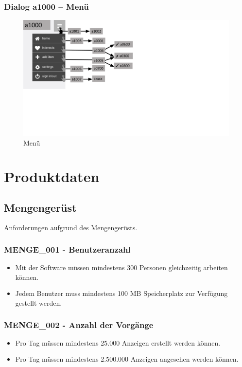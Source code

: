 \documentclass[a4paper,12pt,oneside]{scrartcl}
\begin{document}
\subsubsection{Dialog a1000 – Menü}
\begin{figure}[!htbp]
\centering
\noindent\includegraphics[width=\linewidth,height=\textheight,keepaspectratio]{Dialoge/a1000}
\caption{Menü}
\end{figure}
\FloatBarrier


\section{Produktdaten}
\subsection{Mengengerüst}
Anforderungen aufgrund des Mengengerüsts. 

\subsubsection*{MENGE\_001 - Benutzeranzahl}
\begin{itemize}
	\item Mit der Software müssen mindestens 300 Personen gleichzeitig arbeiten können. 
	\item Jedem Benutzer muss mindestens 100 MB Speicherplatz zur Verfügung gestellt werden. 
\end{itemize}

\subsubsection*{MENGE\_002 - Anzahl der Vorgänge }
\begin{itemize}
	\item Pro Tag müssen mindestens 25.000 Anzeigen erstellt werden können. 
	\item Pro Tag müssen mindestens 2.500.000 Anzeigen angesehen werden können.
\end{itemize}
\end{document}

